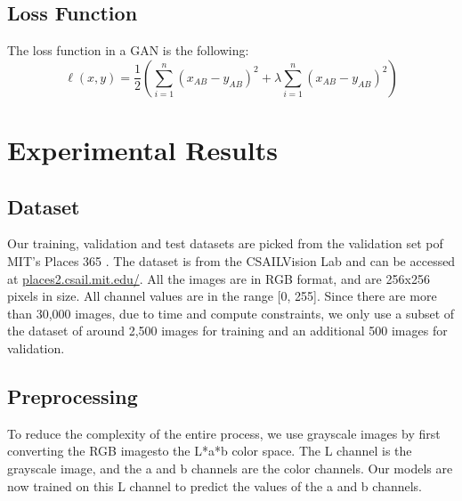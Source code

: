 \documentclass{article}
\begin{document}
\subsection{Loss Function}
The loss function in a GAN is the following:
\begin{equation}
    \ell(x,y) = \frac{1}{2} \left( \sum_{i=1}^{n} \left( x_{AB} - y_{AB} \right)^2 + \lambda \sum_{i=1}^{n} \left( x_{AB} - y_{AB} \right)^2 \right)
\end{equation}


\section{Experimental Results}


\subsection{Dataset}
Our training, validation and test datasets are picked from the validation set pof MIT's Places 365 \cite{7}. The dataset is from the CSAILVision Lab and can be accessed at \url{places2.csail.mit.edu/}.
All the images are in RGB format, and are 256x256 pixels in size. All channel values are in the range [0, 255].
Since there are more than 30,000 images, due to time and compute constraints, we only use a subset of the dataset of around 2,500 images for training and an additional 500 images for validation.

\subsection{Preprocessing}
To reduce the complexity of the entire process, we use grayscale images by first converting the RGB imagesto the L*a*b color space.
The L channel is the grayscale image, and the a and b channels are the color channels.
Our models are now trained on this L channel to predict the values of the a and b channels.
\end{document}

